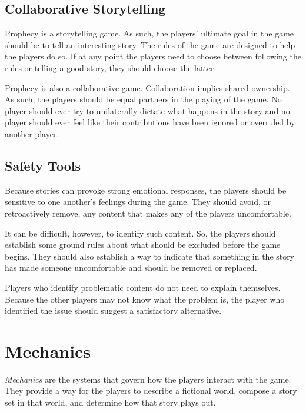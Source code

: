 \documentclass[12pt, a5paper, parskip=half-]{scrartcl}
\begin{document}
\newpage

\subsection*{Collaborative Storytelling} \label{subsection:collaborative-storytelling}
Prophecy is a storytelling game.
As such, the players' ultimate goal in the game should be to tell an interesting story.
The rules of the game are designed to help the players do so.
If at any point the players need to choose between following the rules or telling a good story, they should choose the latter.

Prophecy is also a collaborative game.
Collaboration implies shared ownership.
As such, the players should be equal partners in the playing of the game.
No player should ever try to unilaterally dictate what happens in the story and no player should ever feel like their contributions have been ignored or overruled by another player.

\subsection*{Safety Tools} \label{subsection:safety-tools}
Because stories can provoke strong emotional responses, the players should be sensitive to one another's feelings during the game.
They should avoid, or retroactively remove, any content that makes any of the players uncomfortable.

It can be difficult, however,  to identify such content. 
So, the players should establish some ground rules about what should be excluded before the game begins. 
They should also establish a way to indicate that something in the story has made someone uncomfortable and should be removed or replaced.

Players who identify problematic content do not need to explain themselves.
Because the other players may not know what the problem is, the player who identified the issue should suggest a satisfactory alternative.

\newpage

\section*{Mechanics}  \label{section:mechanics}
\emph{Mechanics} are the systems that govern how the players interact with the game.
They provide a way for the players to describe a fictional world, compose a story set in that world, and determine how that story plays out.
\end{document}

